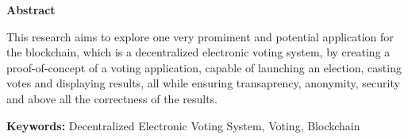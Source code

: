 \newpage

\thispagestyle{empty}

\vspace*{2cm}

\begin{center}
\textbf{Abstract}
\end{center}


This research aims to explore one very promiment and potential application for the blockchain, which is a decentralized electronic voting system, by creating a proof-of-concept of a voting application, capable of launching an election, casting votes and displaying results, all while ensuring transaprency, anonymity, security and above all the correctness of the results.\medskip


\textbf{Keywords:} Decentralized Electronic Voting System, Voting, Blockchain
